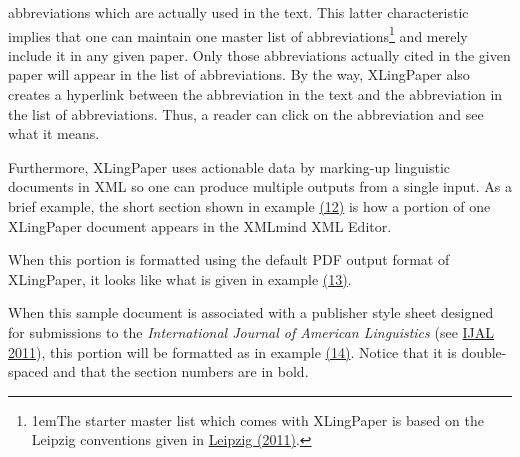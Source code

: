 \documentclass[12pt]{article}
\begin{document}
abbreviations which are actually used in the text. This latter characteristic implies that one can maintain one master list of abbreviations\protect\footnote[5]{{\parindent1em\protect\hypertarget{nLeipzig}{}The starter master list which comes with {XLingPaper} is based on the Leipzig conventions given in \hyperlink{rLeipzig}{Leipzig (2011)}.}} and merely include it in any given paper. Only those abbreviations actually cited in the given paper will appear in the list of abbreviations. By the way, {XLingPaper} also creates a hyperlink between the abbreviation in the text and the abbreviation in the list of abbreviations. Thus, a reader can click on the abbreviation and see what it means.\par{}\indent Furthermore, {XLingPaper}  uses actionable data by marking-up linguistic documents in XML so one can produce multiple outputs from a single input.  As a brief example, the short section shown in example \hyperlink{xSVCZSectionsXXE}{(12)} is how a portion of one {XLingPaper} document appears in the {XMLmind XML Editor}.\par{}{\vspace{12pt}\raggedright{}
\vspace{12pt}}\par\indent When this portion is formatted using the default PDF output format of {XLingPaper}, it looks like what is given in example \hyperlink{xSVCZSectionsDefault}{(13)}.\par{}{\vspace{12pt}\raggedright{}
\vspace{12pt}}\par\indent When this sample document is associated with a publisher style sheet designed for submissions to the {\textit{International Journal of American Linguistics}} (see \hyperlink{rIJALStyleSheet}{IJAL  2011}), this portion will be formatted as in example \hyperlink{xSVCZSectionsIJALSubmission}{(14)}.  Notice that it is double-spaced and that the section numbers are in bold.\par{}{\vspace{12pt}\raggedright{}
}
\end{document}
